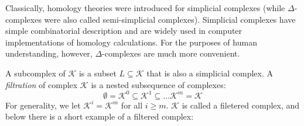 \documentclass[11pt,a4paper]{report}
\begin{document}
            
            Classically, homology theories were introduced for simplicial complexes (while $\Delta$-complexes were also called semi-simplicial complexes).
            Simplicial complexes have simple combinatorial description and are widely used in computer implementations of homology calculations. For the purposes of human 
            understanding, however, $\Delta$-complexes are much more convenient.
            
            A subcomplex of $\mathcal{K}$ is a subset $L \subseteq \mathcal{K}$ that is also a simplicial complex.
            \label{complexfiltration}
            A \emph{filtration} of complex $\mathcal{K}$ is a nested subsequence of complexes: 
             \[
              \emptyset = \mathcal{K}^0 \subseteq \mathcal{K}^1 \subseteq \dots \mathcal{K}^m = \mathcal{K}  
             \]
             For generality, we let $\mathcal{K}^i = \mathcal{K}^m$ for all $i \geq m$. $\mathcal{K}$ is called a filetered complex, and below there is a short example of a filtered complex: 
             
\end{document}
